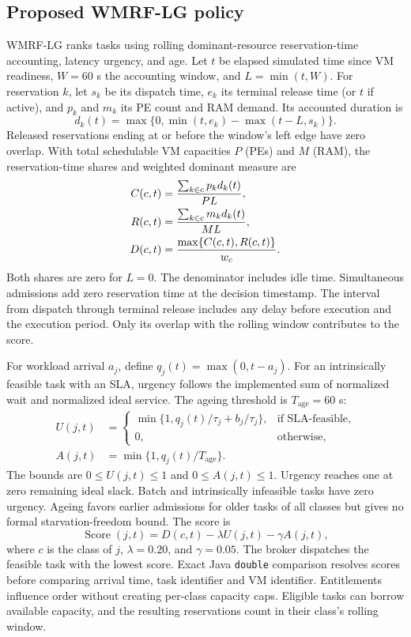 \documentclass[conference]{IEEEtran}
\newcommand{\wmrf}{WMRF-LG}
\begin{document}
\subsection{Proposed WMRF-LG policy}
\wmrf{} ranks tasks using rolling dominant-resource reservation-time accounting, latency urgency, and age. Let $t$ be elapsed simulated time since VM readiness, $W=60$ s the accounting window, and $L=\min(t,W)$. For reservation $k$, let $s_k$ be its dispatch time, $e_k$ its terminal release time (or $t$ if active), and $p_k$ and $m_k$ its PE count and RAM demand. Its accounted duration is
\begin{equation}
 d_k(t)=\max\{0,\min(t,e_k)-\max(t-L,s_k)\}.
 \label{eq:overlap}
\end{equation}
Released reservations ending at or before the window's left edge have zero overlap. With total schedulable VM capacities $P$ (PEs) and $M$ (RAM), the reservation-time shares and weighted dominant measure are
\begin{align}
 C(c,t)&=\frac{\sum_{k\in c}p_k d_k(t)}{P L},\notag\\
 R(c,t)&=\frac{\sum_{k\in c}m_k d_k(t)}{M L},\notag\\
 D(c,t)&=\frac{\max\{C(c,t),R(c,t)\}}{w_c}.
 \label{eq:service}
\end{align}
Both shares are zero for $L=0$. The denominator includes idle time. Simultaneous admissions add zero reservation time at the decision timestamp. The interval from dispatch through terminal release includes any delay before execution and the execution period. Only its overlap with the rolling window contributes to the score.

For workload arrival $a_j$, define $q_j(t)=\max(0,t-a_j)$. For an intrinsically feasible task with an SLA, urgency follows the implemented sum of normalized wait and normalized ideal service. The ageing threshold is $T_{\mathrm{age}}=60$ s:
\begin{align}
 U(j,t)&=
 \begin{cases}
 \min\{1,q_j(t)/\tau_j+b_j/\tau_j\},
   & \text{if SLA-feasible},\\
 0,& \text{otherwise},
 \end{cases}\label{eq:urgency}\\
 A(j,t)&=\min\{1,q_j(t)/T_{\mathrm{age}}\}.
 \label{eq:ageing}
\end{align}
The bounds are $0\leq U(j,t)\leq1$ and $0\leq A(j,t)\leq1$. Urgency reaches one at zero remaining ideal slack. Batch and intrinsically infeasible tasks have zero urgency. Ageing favors earlier admissions for older tasks of all classes but gives no formal starvation-freedom bound. The score is
\begin{equation}
 \operatorname{Score}(j,t)=D(c,t)-\lambda U(j,t)-\gamma A(j,t),
 \label{eq:score}
\end{equation}
where $c$ is the class of $j$, $\lambda=0.20$, and $\gamma=0.05$. The broker dispatches the feasible task with the lowest score. Exact Java \texttt{double} comparison resolves scores before comparing arrival time, task identifier and VM identifier. Entitlements influence order without creating per-class capacity caps. Eligible tasks can borrow available capacity, and the resulting reservations count in their class's rolling window.
\end{document}
